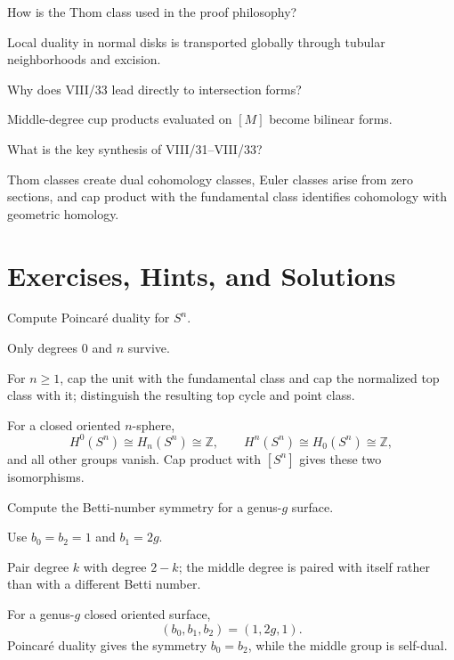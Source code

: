 \begin{problem}
How is the Thom class used in the proof philosophy?
\end{problem}
\begin{solution}
Local duality in normal disks is transported globally through tubular neighborhoods and excision.
\end{solution}

\begin{problem}
Why does VIII/33 lead directly to intersection forms?
\end{problem}
\begin{solution}
Middle-degree cup products evaluated on $[M]$ become bilinear forms.
\end{solution}

\begin{problem}
What is the key synthesis of VIII/31--VIII/33?
\end{problem}
\begin{solution}
Thom classes create dual cohomology classes, Euler classes arise from zero sections, and cap product with the fundamental class identifies cohomology with geometric homology.
\end{solution}

\section{Exercises, Hints, and Solutions}
\begin{exercise}\label{exr:viii33-01}
Compute Poincaré duality for $S^n$.
\end{exercise}
\begin{hint}
Only degrees $0$ and $n$ survive.

For \(n\ge1\), cap the unit with the fundamental class and cap the normalized top class with it; distinguish the resulting top cycle and point class.
\end{hint}
\begin{solution}
For a closed oriented \(n\)-sphere,
\[
H^0(S^n)\cong H_n(S^n)\cong\mathbb Z,\qquad
H^n(S^n)\cong H_0(S^n)\cong\mathbb Z,
\]
and all other groups vanish. Cap product with \([S^n]\) gives these two isomorphisms.
\end{solution}

\begin{exercise}\label{exr:viii33-02}
Compute the Betti-number symmetry for a genus-$g$ surface.
\end{exercise}
\begin{hint}
Use $b_0=b_2=1$ and $b_1=2g$.

Pair degree \(k\) with degree \(2-k\); the middle degree is paired with itself rather than with a different Betti number.
\end{hint}
\begin{solution}
For a genus-\(g\) closed oriented surface,
\[
(b_0,b_1,b_2)=(1,2g,1).
\]
Poincaré duality gives the symmetry \(b_0=b_2\), while the middle group is self-dual.
\end{solution}


